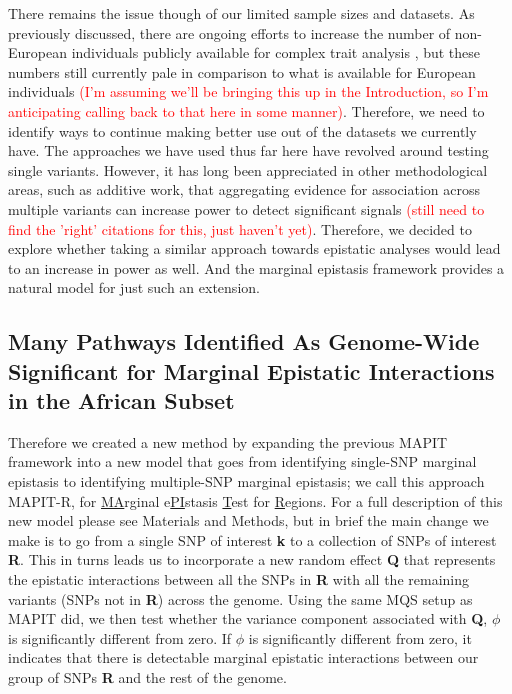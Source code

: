 \documentclass[12pt,a4paper]{article}
\begin{document}
There remains the issue though of our limited sample sizes and datasets. As previously discussed, there are ongoing efforts to increase the number of non-European individuals publicly available for complex trait analysis \citep{Matise2011,Kowalski2019}, but these numbers still currently pale in comparison to what is available for European individuals \textcolor{red}{(I'm assuming we'll be bringing this up in the Introduction, so I'm anticipating calling back to that here in some manner)}. Therefore, we need to identify ways to continue making better use out of the datasets we currently have. The approaches we have used thus far here have revolved around testing single variants. However, it has long been appreciated in other methodological areas, such as additive work, that aggregating evidence for association across multiple variants can increase power to detect significant signals \textcolor{red}{(still need to find the 'right' citations for this, just haven't yet)}\citep{}. Therefore, we decided to explore whether taking a similar approach towards epistatic analyses would lead to an increase in power as well. And the marginal epistasis framework provides a natural model for just such an extension. 

\subsection{Many Pathways Identified As Genome-Wide Significant for Marginal Epistatic Interactions in the African Subset}\label{InterPath-Results-PathwayEpistasis}

Therefore we created a new method by expanding the previous MAPIT framework into a new model that goes from identifying single-SNP marginal epistasis to identifying multiple-SNP marginal epistasis; we call this approach MAPIT-R, for \underline{MA}rginal e\underline{PI}stasis \underline{T}est for \underline{R}egions. For a full description of this new model please see Materials and Methods, but in brief the main change we make is to go from a single SNP of interest \textbf{k} to a collection of SNPs of interest \textbf{R}. This in turns leads us to incorporate a new random effect  \textbf{Q} that represents the epistatic interactions between all the SNPs in \textbf{R} with all the remaining variants (SNPs not in \textbf{R}) across the genome. Using the same MQS \citep{Zhou2017} setup as MAPIT did, we then test whether the variance component associated with \textbf{Q}, $\phi$ is significantly different from zero. If $\phi$ is significantly different from zero, it indicates that there is detectable marginal epistatic interactions between our group of SNPs \textbf{R} and the rest of the genome.
\end{document}
